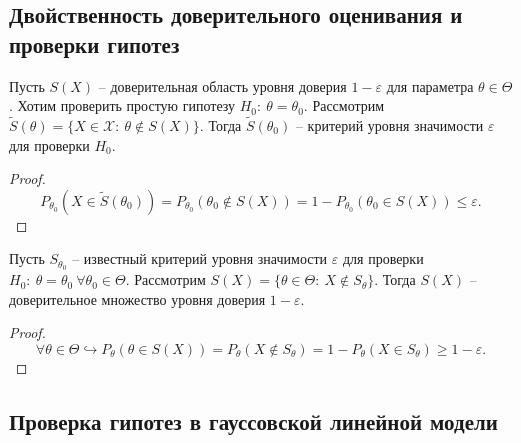 \subsection{Двойственность доверительного оценивания и проверки гипотез}
\begin{proposition}
    Пусть $\displaystyle S( X)$ -- доверительная область уровня доверия $\displaystyle 1-\varepsilon $ для параметра $\displaystyle \theta \in \Theta $. Хотим проверить простую гипотезу $\displaystyle H_{0} :\ \theta =\theta _{0}$. Рассмотрим $\displaystyle \tilde{S}( \theta ) =\{X\in \mathcal{X} :\ \theta \notin S( X)\}$. Тогда $\displaystyle \tilde{S}( \theta _{0})$ -- критерий уровня значимости $\displaystyle \varepsilon $ для проверки $\displaystyle H_{0}$.
\end{proposition}
\begin{proof}
    \begin{equation*}
        P_{\theta _{0}}\left( X\in \tilde{S}( \theta _{0})\right) =P_{\theta _{0}}( \theta _{0} \notin S( X)) =1-P_{\theta _{0}}( \theta _{0} \in S( X)) \leqslant \varepsilon .
    \end{equation*}
\end{proof}
\begin{proposition}
    Пусть $\displaystyle S_{\theta _{0}}$ -- известный критерий уровня значимости $\displaystyle \varepsilon $ для проверки $\displaystyle H_{0} :\ \theta =\theta _{0} \ \forall \theta _{0} \in \Theta $. Рассмотрим $\displaystyle S( X) =\{\theta \in \Theta :\ X\notin S_{\theta }\}$. Тогда $\displaystyle S( X)$ -- доверительное множество уровня доверия $\displaystyle 1-\varepsilon $.
\end{proposition}
\begin{proof}
    \begin{equation*}
        \forall \theta \in \Theta \hookrightarrow P_{\theta }( \theta \in S( X)) =P_{\theta }( X\notin S_{\theta }) =1-P_{\theta }( X\in S_{\theta }) \geqslant 1-\varepsilon .
    \end{equation*}
\end{proof}
\subsection{Проверка гипотез в гауссовской линейной модели}

